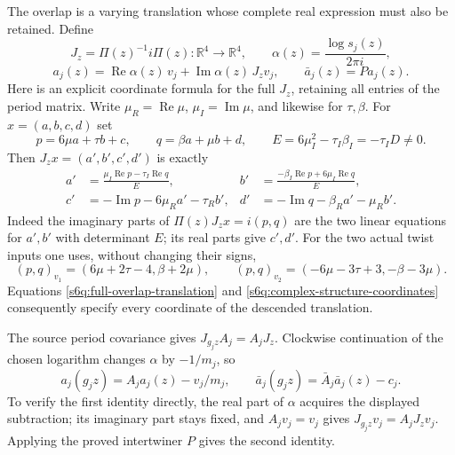 The overlap is a varying translation whose complete real expression must
also be retained. Define
\[
 J_z=\Pi(z)^{-1}i\Pi(z):\mathbb R^4\to\mathbb R^4,
 \qquad \alpha(z)=\frac{\log s_j(z)}{2\pi i},
\]
\begin{equation}
 a_j(z)=\operatorname{Re}\alpha(z)\,v_j+
          \operatorname{Im}\alpha(z)\,J_zv_j,
 \qquad \bar a_j(z)=Pa_j(z).
 \label{s6q:full-overlap-translation}
\end{equation}
Here is an explicit coordinate formula for the full $J_z$, retaining all
entries of the period matrix. Write $\mu_R=\operatorname{Re}\mu$,
$\mu_I=\operatorname{Im}\mu$, and likewise for $\tau,\beta$. For
$x=(a,b,c,d)$ set
\[
 p=6\mu a+\tau b+c,\qquad q=\beta a+\mu b+d,
 \qquad E=6\mu_I^2-\tau_I\beta_I=-\tau_ID\ne0.
\]
Then $J_zx=(a',b',c',d')$ is exactly
\begin{equation}
 \begin{aligned}
 a'&=\frac{\mu_I\operatorname{Re}p-\tau_I\operatorname{Re}q}{E},&
 b'&=\frac{-\beta_I\operatorname{Re}p+6\mu_I\operatorname{Re}q}{E},\\
 c'&=-\operatorname{Im}p-6\mu_Ra'-\tau_Rb',&
 d'&=-\operatorname{Im}q-\beta_Ra'-\mu_Rb'.
 \end{aligned}
 \label{s6q:complex-structure-coordinates}
\end{equation}
Indeed the imaginary parts of $\Pi(z)J_zx=i(p,q)$ are the two linear
equations for $a',b'$ with determinant $E$; its real parts give $c',d'$.
For the two actual twist inputs one uses, without changing their signs,
\[
 (p,q)_{v_1}=(6\mu+2\tau-4,\beta+2\mu),\qquad
 (p,q)_{v_2}=(-6\mu-3\tau+3,-\beta-3\mu).
\]
Equations \eqref{s6q:full-overlap-translation} and
\eqref{s6q:complex-structure-coordinates} consequently specify every
coordinate of the descended translation.

The source period covariance gives
$J_{g_jz}A_j=A_jJ_z$. Clockwise continuation of the chosen logarithm
changes $\alpha$ by $-1/m_j$, so
\begin{equation}
 a_j(g_jz)=A_ja_j(z)-v_j/m_j,
 \qquad \bar a_j(g_jz)=\bar A_j\bar a_j(z)-c_j.
 \label{s6q:overlap-covariance}
\end{equation}
To verify the first identity directly, the real part of $\alpha$ acquires
the displayed subtraction; its imaginary part stays fixed, and
$A_jv_j=v_j$ gives $J_{g_jz}v_j=A_jJ_zv_j$. Applying the proved
intertwiner $P$ gives the second identity.

